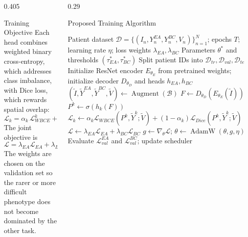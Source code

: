 \documentclass[final]{beamer}
\begin{document}
\begin{frame}[t]
\begin{columns}[t,totalwidth=\dimexpr\paperwidth-4cm\relax]
\begin{column}{0.405\textwidth}
  \begin{block}{Training Objective}
    Each head combines weighted binary cross-entropy, which addresses class
    imbalance, with Dice loss, which rewards spatial overlap:
    \[
      \mathcal{L}_k=\alpha_k\,\mathcal{L}_{WBCE}^{k}
      +(1-\alpha_k)\,\mathcal{L}_{Dice}^{k}.
    \]
    The joint objective is
    \[
      \mathcal{L}=\lambda_{EA}\mathcal{L}_{EA}
      +\lambda_{BC}\mathcal{L}_{BC}.
    \]
    The weights are chosen on the validation set so the rarer or more difficult
    phenotype does not become dominated by the other task.
  \end{block}
\end{column}

\begin{column}{0.29\textwidth}
  \begin{block}{Proposed Training Algorithm}
    {\normalsize
    \begin{algorithm}[H]
      \caption{Patient-level multi-task segmentation training}
      \begin{algorithmic}[1]
        \Require Patient dataset
          $\mathcal D=\{(I_n,Y_n^{EA},Y_n^{BC},V_n)\}_{n=1}^{N}$;
          epochs $T$; learning rate $\eta$; loss weights
          $\lambda_{EA},\lambda_{BC}$
        \Ensure Parameters $\theta^*$ and thresholds
          $(\tau_{EA}^*,\tau_{BC}^*)$
        \State Split patient IDs into
          $\mathcal D_{tr},\mathcal D_{val},\mathcal D_{te}$
        \State Initialize ResNet encoder $E_{\theta_E}$ from pretrained weights;
          initialize decoder $D_{\theta_D}$ and heads $h_{EA},h_{BC}$
            \State $(\tilde I,\tilde Y^{EA},\tilde Y^{BC},\tilde V)
              \gets \operatorname{Augment}(\mathcal B)$
            \State $F\gets D_{\theta_D}(E_{\theta_E}(\tilde I))$
              \State $P^k\gets\sigma(h_k(F))$
              \State $\mathcal L_k\gets
                \alpha_k\mathcal L_{WBCE}(P^k,\tilde Y^k;\tilde V)
                +(1-\alpha_k)\mathcal L_{Dice}(P^k,\tilde Y^k;\tilde V)$
            \EndFor
            \State $\mathcal L\gets
              \lambda_{EA}\mathcal L_{EA}+\lambda_{BC}\mathcal L_{BC}$
            \State $g\gets\nabla_{\theta}\mathcal L$;
              $\theta\gets\operatorname{AdamW}(\theta,g,\eta)$
          \EndFor
          \State Evaluate $\mathcal L_{val}^{EA}$ and
            $\mathcal L_{val}^{BC}$; update scheduler

\end{algorithmic}
\end{algorithm}}
\end{block}
\end{column}
\end{columns}
\end{frame}
\end{document}
